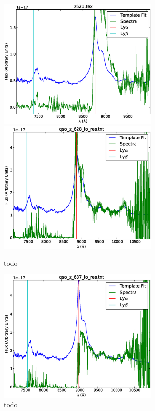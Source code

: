 \documentclass[11pt]{article}
\begin{document}
\begin{figure}[h]
  \includegraphics[width=8cm]{z621.eps}
  \includegraphics[width=8cm]{qso_z_628_lo_res.eps}
  \caption{todo}
  \label{fig:todo}
\end{figure}

\begin{figure}[h]
  \centering
  \includegraphics[width=8cm]{qso_z_637_lo_res.eps}
  \caption{todo}
  \label{fig:todo}
\end{figure}
\end{document}
